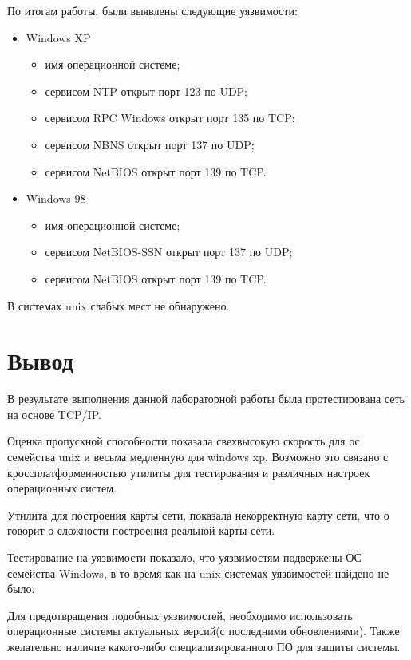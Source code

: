 \documentclass[a4paper, 12pt]{article}		%
\begin{document}
По итогам работы, были выявлены следующие уязвимости:
\begin{itemize}
\item Windows XP
\begin{itemize}
\item имя операционной системе;
\item сервисом NTP открыт порт 123 по UDP;
\item сервисом RPC Windows открыт порт 135 по TCP;
\item сервисом NBNS открыт порт 137 по UDP;
\item сервисом NetBIOS открыт порт 139 по TCP.
\end{itemize}
\item Windows 98
\begin{itemize}
\item имя операционной системе;
\item сервисом NetBIOS-SSN открыт порт 137 по UDP;
\item сервисом NetBIOS открыт порт 139 по TCP.
\end{itemize}
\end{itemize}
В системах unix слабых мест не обнаружено.
\section*{Вывод}
В результате выполнения данной лабораторной работы была протестирована сеть на основе TCP/IP. 

Оценка пропускной способности показала свехвысокую скорость для ос семейства unix и весьма медленную для windows xp. Возможно это связано с кроссплатформенностью утилиты для тестирования и различных настроек операционных систем.

Утилита для построения карты сети, показала некорректную карту сети, что о говорит о сложности построения реальной карты сети.

Тестирование на уязвимости показало, что уязвимостям подвержены ОС семейства Windows, в то время как на unix системах уязвимостей найдено не было.

Для предотвращения подобных уязвимостей, необходимо использовать операционные системы актуальных версий(с последними обновлениями). Также желательно наличие какого-либо специализированного ПО для защиты системы.

%
%
\end{document}
